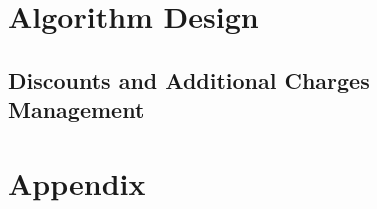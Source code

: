 \documentclass[a4paper,12pt]{report}
\begin{document}
\chapter{Algorithm Design}
\label{algorithm_design}

\section{Discounts and Additional Charges Management}


\appendix
\chapter{Appendix}



\end{document}
